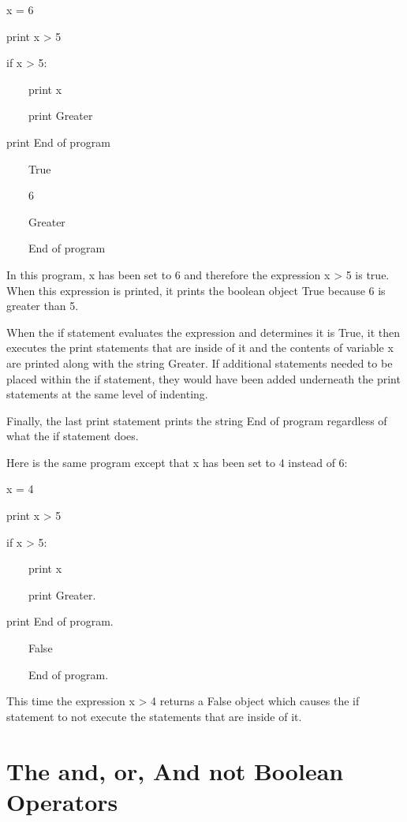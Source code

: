 \documentclass[12pt,oneside]{book}
\begin{document}
x = 6


print x {\textgreater} 5


if x {\textgreater} 5:

\ \ \ \ print x

\ \ \ \ print {\textquotedbl}Greater{\textquotedbl}


print {\textquotedbl}End of program{\textquotedbl}

{\textbar}

\ \ \ \ True

\ \ \ \ 6

\ \ \ \ Greater

\ \ \ \ End of program

In this program, x has been set to 6 and therefore the expression x {\textgreater} 5 is true. When this expression is printed, it prints the boolean object True because 6 is greater than 5. 

When the if statement evaluates the expression and determines it is True, it then executes the print statements that are inside of it and the contents of variable x are printed along with the string {\textquotedbl}Greater{\textquotedbl}. If additional statements needed to be placed within the if statement, they would have been added underneath the print statements at the same level of indenting. 

Finally, the last print statement prints the string {\textquotedbl}End of program{\textquotedbl} regardless of what the if statement does. 

Here is the same program except that x has been set to 4 instead of 6:


x = 4


print x {\textgreater} 5


if x {\textgreater} 5:

\ \ \ \ print x

\ \ \ \ print {\textquotedbl}Greater.{\textquotedbl}


print {\textquotedbl}End of program.{\textquotedbl}

{\textbar}

\ \ \ \ False

\ \ \ \ End of program.

This time the expression x {\textgreater} 4 returns a False object which causes the if statement to not execute the statements that are inside of it.

\section[The and, or, And not Boolean Operators]{The and, or, And not Boolean Operators}
\end{document}
